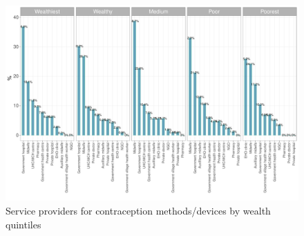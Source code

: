 \documentclass[12pt,a4paper]{article}
\begin{document}
\begin{figure}[H]

{\centering \includegraphics{kayahReport_files/figure-latex/fplan4plot-1} 

}

\caption{Service providers for contraception methods/devices by wealth quintiles}\label{fig:fplan4plot}
\end{figure}
\end{document}
